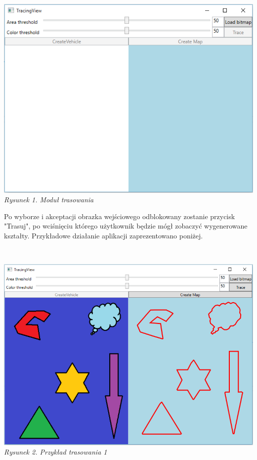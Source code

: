 \documentclass{article}
\begin{document}
~\\\begin{center}
	\includegraphics[scale=0.7]{tracingview}\\
	\textit{Rysunek 1. Moduł trasowania}
\end{center}
\newpage
Po wyborze i akceptacji obrazka wejściowego odblokowany zostanie przycisk "Trasuj", po wciśnięciu którego użytkownik będzie mógł zobaczyć wygenerowane kształty. Przykładowe działanie aplikacji zaprezentowano poniżej.

~\\\begin{center}
	\includegraphics[scale=0.56]{tracingview2}\\
	\textit{Rysunek 2. Przykład trasowania 1}
\end{center}
\end{document}
